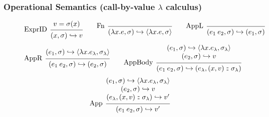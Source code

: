 \documentclass{beamer}
\theoremstyle{definition}
\newcommand*{\cons}{:{\hspace{-0.7em}}:}
\newcommand*{\ctx}{\sigma}
\newcommand*{\semarrow}{\hookrightarrow}
\begin{document}
\begin{frame}[c]
  \frametitle{Operational Semantics (call-by-value $\lambda$ calculus)}
  \begin{figure}[t!]
    \scriptsize
    \begin{flushright}
      \fbox{$(e,\ctx)\semarrow V\text{ or }(e',\ctx')$}
    \end{flushright}
    \centering
    \vspace{0pt} %
    \[
      \begin{prooftree}
        \hypo{v=\ctx(x)}
        \infer[left label=ExprID]1{
        (x, \ctx)
        \semarrow
        v
        }
      \end{prooftree}\qquad
      \begin{prooftree}
        \infer[left label=Fn]0{
        (\lambda x.e, \ctx)
        \semarrow
        \langle\lambda x.e, \ctx\rangle
        }
      \end{prooftree}\qquad
      \begin{prooftree}
        \infer[left label={AppL}]0{
        (e_{1}\:e_{2}, \ctx)
        \semarrow
        (e_{1},\ctx)
        }
      \end{prooftree}
    \]
    \[
      \begin{prooftree}
        \hypo{
          \begin{matrix}
            (e_{1}, \ctx)
            \semarrow
            \langle\lambda x.e_{\lambda}, \ctx_{\lambda}\rangle
          \end{matrix}
        }
        \infer[left label={AppR}]1{
        (e_{1}\:e_{2}, \ctx)
        \semarrow
        (e_{2}, \ctx)
        }
      \end{prooftree}\qquad
      \begin{prooftree}
        \hypo{
          \begin{matrix}
            (e_{1}, \ctx)
            \semarrow
            \langle\lambda x.e_{\lambda}, \ctx_{\lambda}\rangle \\
            (e_{2}, \ctx)
            \semarrow
            v
          \end{matrix}
        }
        \infer[left label={AppBody}]1{
        (e_{1}\:e_{2}, \ctx)
        \semarrow
        (e_{\lambda}, (x, v)\cons \ctx_{\lambda})
        }
      \end{prooftree}
    \]
    \[
      \begin{prooftree}
        \hypo{
          \begin{matrix}
            (e_{1}, \ctx)
            \semarrow
            \langle\lambda x.e_{\lambda}, \ctx_{\lambda}\rangle \\
            (e_{2}, \ctx)
            \semarrow
            v                                                   \\
            (e_{\lambda}, (x, v)\cons \ctx_{\lambda})
            \semarrow
            v'
          \end{matrix}
        }
        \infer[left label={App}]1{
        (e_{1}\:e_{2}, \ctx)
        \semarrow
        v'
        }
      \end{prooftree}
    \]
  \end{figure}
\end{frame}
\end{document}
